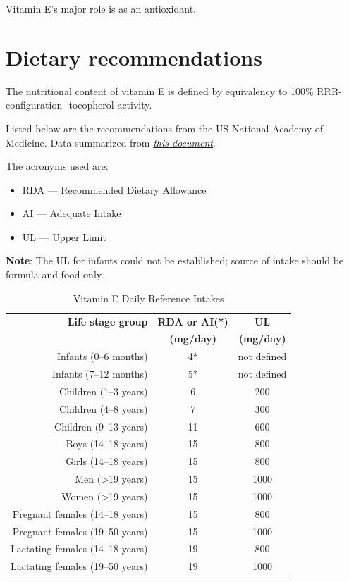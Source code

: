\documentclass{book}
\begin{document}
\begin{sloppypar}
Vitamin E's major role is as an antioxidant.

\section{Dietary recommendations}
The nutritional content of vitamin E is defined by equivalency to 100\% RRR-configuration \textalpha -tocopherol activity.

Listed below are the recommendations from the US National Academy of Medicine. Data summarized from \href{https://nap.nationalacademies.org/read/9810/chapter/8}{\textit{this document}}.

The acronyms used are:
\begin{itemize}
	\item RDA --- Recommended Dietary Allowance
	\item AI --- Adequate Intake
	\item UL --- Upper Limit
\end{itemize}

\textbf{Note}: The UL for infants could not be established; source of intake should be formula and food only.

\begin{table}[ht]
	\caption{Vitamin E Daily Reference Intakes}
	\centering \begin{tabular}{| r | c | c |}
		\hline
		\textbf{Life stage group}			& \textbf{RDA or AI(*)}	& \textbf{UL}		\\
											& \textbf{(mg/day)}		& \textbf{(mg/day)}	\\ \hline
		Infants (0--6 months)				& 4*					& not defined		\\ \hline
		Infants (7--12 months)				& 5*					& not defined		\\ \hline
		Children (1--3 years)				& 6						& 200				\\ \hline
		Children (4--8 years)				& 7						& 300				\\ \hline
		Children (9--13 years)				& 11					& 600				\\ \hline
		Boys (14--18 years)					& 15					& 800				\\ \hline
		Girls (14--18 years)				& 15					& 800				\\ \hline
		Men (\textgreater19 years)			& 15					& 1000				\\ \hline
		Women (\textgreater19 years)		& 15					& 1000				\\ \hline
		Pregnant females (14--18 years)		& 15					& 800				\\ \hline
		Pregnant females (19--50 years)		& 15					& 1000				\\ \hline
		Lactating females (14--18 years)	& 19					& 800				\\ \hline
		Lactating females (19--50 years)	& 19					& 1000				\\ \hline
	\end{tabular}
\end{table}
\newpage


\end{sloppypar}
\end{document}
